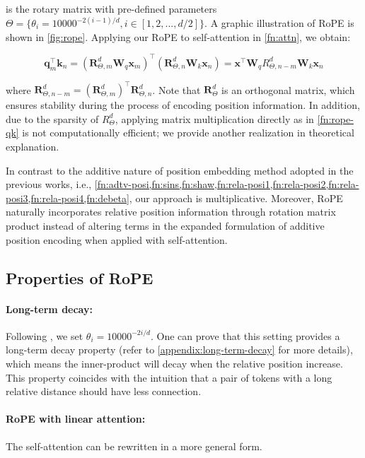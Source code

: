 is the rotary matrix with pre-defined parameters $\Theta = \{\theta_i=10000^{-2(i-1)/d}, i \in [1, 2, ..., d/2]\}$. A graphic illustration of RoPE is shown in \ref{fig:rope}. Applying our RoPE to self-attention in \ref{fn:attn}, we obtain:

\begin{equation}
	{\boldsymbol q}_m^{\intercal}{\boldsymbol k}_n 
	=({\boldsymbol R}^d_{\Theta, m}{\boldsymbol W}_q{\boldsymbol x}_m)^\intercal({\boldsymbol R}^d_{\Theta, n}{\boldsymbol W}_k{\boldsymbol x}_n) ={\boldsymbol x}^\intercal{\boldsymbol W}_qR^d_{\Theta, n-m}{\boldsymbol W}_k{\boldsymbol x}_n
	\label{fn:rope-qk}
\end{equation}

where ${\boldsymbol R}^d_{\Theta, n-m}=({\boldsymbol R}^{d}_{\Theta, m})^\intercal{\boldsymbol R}^d_{\Theta, n}$. Note that ${\boldsymbol R}^d_\Theta$ is an orthogonal matrix, which ensures stability during the process of encoding position information. In addition, due to the sparsity of $R^d_\Theta$, applying matrix multiplication directly as in \ref{fn:rope-qk} is not computationally efficient; we provide another realization in theoretical explanation.

In contrast to the additive nature of position embedding method adopted in the previous works, i.e.,  \ref{fn:adtv-posi,fn:sins,fn:shaw,fn:rela-posi1,fn:rela-posi2,fn:rela-posi3,fn:rela-posi4,fn:debeta}, our approach is multiplicative. Moreover,  RoPE naturally incorporates relative position information through rotation matrix product instead of altering terms in the expanded formulation of additive position encoding when applied with self-attention. 

\subsection{Properties of RoPE}
\label{sec: prop of RoPE}
\paragraph{Long-term decay:} Following \cite{Vaswani:2017}, we set $\theta_i=10000^{-2i/d}$. One can prove that this setting provides a long-term decay property (refer to \ref{appendix:long-term-decay} for more details), which means the inner-product will decay when the relative position increase. This property coincides with the intuition that a pair of tokens with a long relative distance should have less connection.

\paragraph{RoPE with linear attention:} The self-attention can be rewritten in a more general form.

